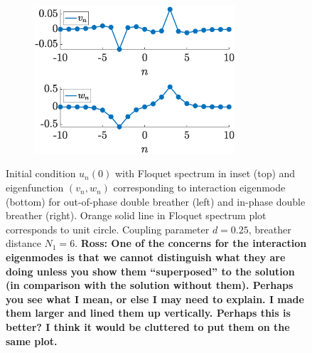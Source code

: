 \documentclass[12pt,reqno]{amsart}
\theoremstyle{definition}
\begin{document}
\begin{figure}
\begin{center}
	\begin{subfigure}{0.45\linewidth}
		\caption{}
		\includegraphics[width=7.5cm]{doubleppinteig.eps}
		\label{fig:doubled}
	\end{subfigure}
	\end{center}
	\caption{Initial condition $u_n(0)$ with Floquet spectrum in inset (top) and eigenfunction $(v_n, w_n)$ corresponding to interaction eigenmode (bottom) for out-of-phase double breather (left) and in-phase double breather (right). Orange solid line in Floquet spectrum plot corresponds to unit circle. Coupling parameter $d = 0.25$, breather distance $N_1 = 6$.
	{\bf Ross: One of the concerns for the interaction eigenmodes
	is that we cannot distinguish what they are doing unless
	you show them ``superposed'' to the solution (in comparison
	with the solution without them). Perhaps you see what
	I mean, or else I may need to explain. I made them larger and lined them up vertically. Perhaps this is better? I think it would be cluttered to put them on the same plot.}}
	\label{fig:double}
\end{figure}
\end{document}
